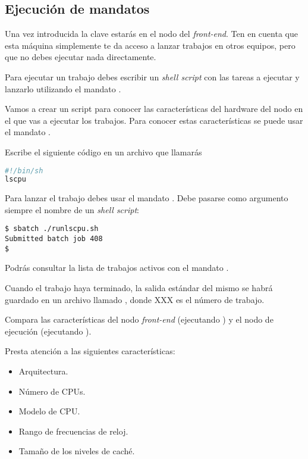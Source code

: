 \subsection{Ejecución de mandatos}

Una vez introducida la clave estarás en el nodo del \emph{front-end}.
Ten en cuenta que esta máquina simplemente te da acceso a lanzar trabajos
en otros equipos, pero que no debes ejecutar nada directamente.

Para ejecutar un trabajo debes escribir un \emph{shell script} con las tareas
a ejecutar y lanzarlo utilizando el mandato .

Vamos a crear un script para conocer las características del hardware del nodo
en el que vas a ejecutar los trabajos. Para conocer estas características
se puede usar el mandato . 

Escribe el siguiente código en un archivo que llamarás 

\begin{lstlisting}[language=bash,frame=single,title={Archivo: runlscpu.sh}]
#!/bin/sh
lscpu
\end{lstlisting}

Para lanzar el trabajo debes usar el mandato .
Debe pasarse como argumento siempre el nombre de un \emph{shell script}:

\begin{lstlisting}[style=terminal]
$ sbatch ./runlscpu.sh
Submitted batch job 408
$
\end{lstlisting}

Podrás consultar la lista de trabajos activos con el mandato .

Cuando el trabajo haya terminado, la salida estándar del mismo se habrá guardado
en un archivo llamado , donde XXX es el número de trabajo.

Compara las características del nodo \emph{front-end} (ejecutando )
y el nodo de ejecución (ejecutando ).

Presta atención a las siguientes características:
\begin{itemize}
  \item Arquitectura.
  \item Número de CPUs.
  \item Modelo de CPU.
  \item Rango de frecuencias de reloj.
  \item Tamaño de los niveles de caché.
\end{itemize}

